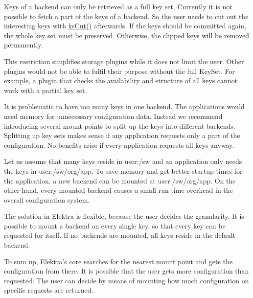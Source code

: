 \label{doc_help_elektra-granularity_md_md_doc_help_elektra_granularity}%
%
 Keys of a backend can only be retrieved as a full key set. Currently it is not possible to fetch a part of the keys of a backend. So the user needs to cut out the interesting keys with {\ttfamily \mbox{\hyperlink{group__keyset_ga6b00cf82b59af4d883a9bad6cf4a4a4a}{ks\+Cut()}}} afterwards. If the keys should be committed again, the whole key set must be preserved. Otherwise, the clipped keys will be removed permanently.

This restriction simplifies storage plugins while it does not limit the user. Other plugins would not be able to fulfil their purpose without the full {\ttfamily Key\+Set}. For example, a plugin that checks the availability and structure of all keys cannot work with a partial key set.

It is problematic to have too many keys in one backend. The applications would need memory for unnecessary configuration data. Instead we recommend introducing several mount points to split up the keys into different backends. Splitting up key sets makes sense if any application requests only a part of the configuration. No benefits arise if every application requests all keys anyway.

Let us assume that many keys reside in {\ttfamily user\+:/sw} and an application only needs the keys in {\ttfamily user\+:/sw/org/app}. To save memory and get better startup-\/times for the application, a new backend can be mounted at {\ttfamily user\+:/sw/org/app}. On the other hand, every mounted backend causes a small run-\/time overhead in the overall configuration system.

The solution in Elektra is flexible, because the user decides the granularity. It is possible to mount a backend on every single key, so that every key can be requested for itself. If no backends are mounted, all keys reside in the default backend.

To sum up, Elektra’s core searches for the nearest mount point and gets the configuration from there. It is possible that the user gets more configuration than requested. The user can decide by means of mounting how much configuration on specific requests are returned. 